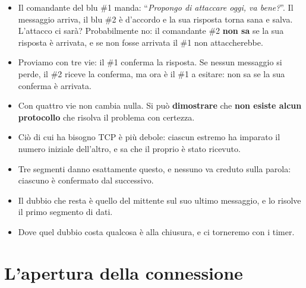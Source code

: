 \begin{itemize}
    \item Il comandante del blu \#1 manda: ``\emph{Propongo di attaccare oggi, va bene?}''. Il messaggio arriva, il
          blu \#2 è d'accordo e la sua risposta torna sana e salva. L'attacco ci sarà? Probabilmente no: il
          comandante \#2 \textbf{non sa} se la sua risposta è arrivata, e se non fosse arrivata il \#1 non attaccherebbe.
    \item Proviamo con tre vie: il \#1 conferma la risposta. Se nessun messaggio si perde, il \#2 riceve la conferma,
          ma ora è il \#1 a esitare: non sa se la sua conferma è arrivata.
    \item Con quattro vie non cambia nulla. Si può \textbf{dimostrare} che \textbf{non esiste alcun protocollo} che
          risolva il problema con certezza.
\end{itemize}



\begin{itemize}
    \item Ciò di cui ha bisogno TCP è più debole: ciascun estremo ha imparato il numero iniziale dell'altro, e sa che il
          proprio è stato ricevuto.
    \item Tre segmenti danno esattamente questo, e nessuno va creduto sulla parola: ciascuno è confermato dal successivo.
    \item Il dubbio che resta è quello del mittente sul suo ultimo messaggio, e lo risolve il primo segmento di dati.
    \item Dove quel dubbio costa qualcosa è alla chiusura, e ci torneremo con i timer.
\end{itemize}

\section{L'apertura della connessione}

